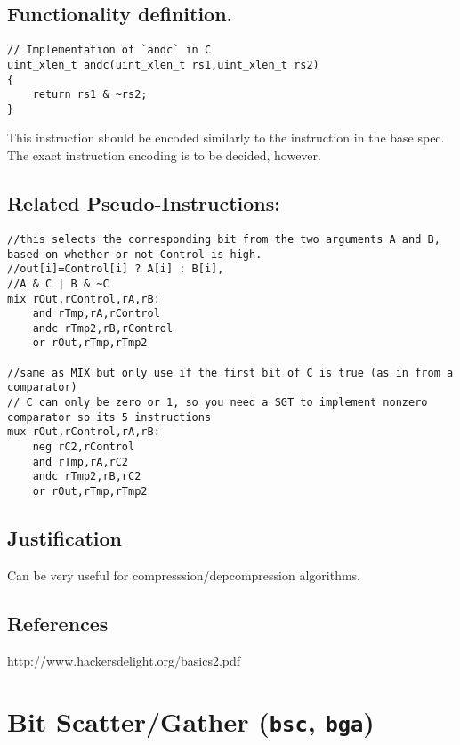 \subsection{Functionality
definition.}\label{functionality-definition.-4}

\begin{verbatim}
// Implementation of `andc` in C
uint_xlen_t andc(uint_xlen_t rs1,uint_xlen_t rs2)
{
    return rs1 & ~rs2;
}
\end{verbatim}

This instruction should be encoded similarly to the instruction in the
base spec. The exact instruction encoding is to be decided, however.

\subsection{Related
Pseudo-Instructions:}\label{related-pseudo-instructions-4}

\begin{verbatim}
//this selects the corresponding bit from the two arguments A and B, based on whether or not Control is high.
//out[i]=Control[i] ? A[i] : B[i],
//A & C | B & ~C
mix rOut,rControl,rA,rB:
    and rTmp,rA,rControl
    andc rTmp2,rB,rControl
    or rOut,rTmp,rTmp2

//same as MIX but only use if the first bit of C is true (as in from a comparator)
// C can only be zero or 1, so you need a SGT to implement nonzero comparator so its 5 instructions
mux rOut,rControl,rA,rB:
    neg rC2,rControl
    and rTmp,rA,rC2
    andc rTmp2,rB,rC2
    or rOut,rTmp,rTmp2
\end{verbatim}

\subsection{Justification}\label{justification-4}

Can be very useful for compresssion/depcompression algorithms.

\subsection{References}\label{references-5}

http://www.hackersdelight.org/basics2.pdf

\section{\texorpdfstring{Bit Scatter/Gather (\texttt{bsc},
\texttt{bga})}{Bit Scatter/Gather (bsc, bga)}}\label{bit-scattergather-bsc-bga}

